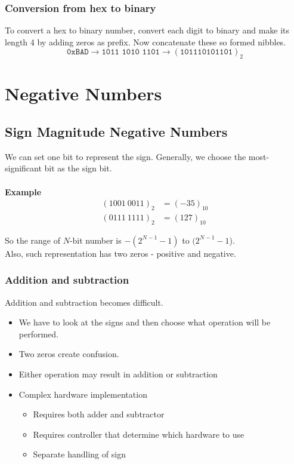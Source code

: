 \documentclass[oneside]{book}
\begin{document}
\subsubsection{Conversion from hex to binary}
To convert a hex to binary number, convert each digit to binary and make its length 4 by adding zeros as prefix. Now concatenate these so formed nibbles.
\[
	\texttt{0xBAD} \longrightarrow \texttt{1011\ 1010\ 1101} \longrightarrow (\texttt{101110101101})_2
\]

\section{Negative Numbers}
\subsection{Sign Magnitude Negative Numbers}
We can set one bit to represent the sign. Generally, we choose the most-significant bit as the sign bit.
\\\\
\textbf{Example}
\begin{align*}
	(1001\ 0011)_2 & = (-35)_{10} \\
	(0111\ 1111)_2 & = (127)_{10}
\end{align*}

\noindent So the range of \(N\)-bit number is \(-(2^{N-1} - 1)\) to \((2^{N-1} - 1\)).
\\
\noindent Also, such representation has two zeros - positive and negative.
\\
\subsubsection{Addition and subtraction}
\noindent Addition and subtraction becomes difficult.
\begin{itemize}
	\item We have to look at the signs and then choose what operation will be performed.
	\item Two zeros create confusion.
	\item Either operation may result in addition or subtraction
	\item Complex hardware implementation
	      \begin{itemize}
		      \item Requires both adder and subtractor
		      \item Requires controller that determine which hardware to use
		      \item Separate handling of sign
	      \end{itemize}
\end{itemize}
\end{document}

